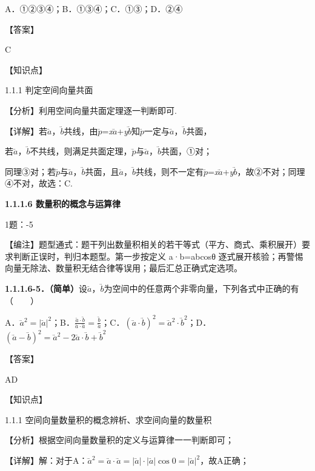 A．①②③④；B．①③④；C．①③；D．②④

【⁠答⁠案⁠】

C　

【⁠知⁠识⁠点⁠】

1.1.1 判定空间向量共面

【⁠分⁠析⁠】利用空间向量共面定理逐一判断即可.

【⁠详⁠解⁠】若\(\overset{⃑}{a}\)，\(\overset{⃑}{b}\)共线，由\(\overset{⃑}{p}\)=\emph{x}\(\overset{⃑}{a}\)+\emph{y}\(\overset{⃑}{b}\)知\(\overset{⃑}{p}\)一定与\(\overset{⃑}{a}\)，\(\overset{⃑}{b}\)共面，

若\(\overset{⃑}{a}\)，\(\overset{⃑}{b}\)不共线，则满足共面定理，\(\overset{⃑}{p}\)与\(\overset{⃑}{a}\)，\(\overset{⃑}{b}\)共面，①对；

同理③对；若\(\overset{⃑}{p}\)与\(\overset{⃑}{a}\)，\(\overset{⃑}{b}\)共面，且\(\overset{⃑}{a}\)，\(\overset{⃑}{b}\)共线，则不一定有\(\overset{⃑}{p}\)=\emph{x}\(\overset{⃑}{a}\)+\emph{y}\(\overset{⃑}{b}\)，故②不对；同理④不对，故选：C.

\textbf{1.1.1.6 数量积的概念与运算律}

1题：-5

【⁠编⁠注⁠】题型通式：题干列出数量积相关的若干等式（平方、商式、乘积展开）要求判断正误时，判归本题型。第一步按定义
a·b=\textbar a\textbar\textbar b\textbar cosθ
逐式展开核验；再警惕向量无除法、数量积无结合律等误用；最后汇总正确式定选项。

\textbf{1.1.1.6-5．（简单）}设\(\overset{⃑}{a}\)，\(\overset{⃑}{b}\)为空间中的任意两个非零向量，下列各式中正确的有（~~~~）

A．\({\overset{⃑}{a}}^{2} = \left| \overset{⃑}{a} \right|^{2}\)；B．\(\frac{\overset{⃑}{a} \cdot \overset{⃑}{b}}{\overset{⃑}{a} \cdot \overset{⃑}{a}} = \frac{\overset{⃑}{b}}{\overset{⃑}{a}}\)；C．\(\left( \overset{⃑}{a} \cdot \overset{⃑}{b} \right)^{2} = {\overset{⃑}{a}}^{2} \cdot {\overset{⃑}{b}}^{2}\)；D．\(\left( \overset{⃑}{a} - \overset{⃑}{b} \right)^{2} = {\overset{⃑}{a}}^{2} - 2\overset{⃑}{a} \cdot \overset{⃑}{b} + {\overset{⃑}{b}}^{2}\)

【⁠答⁠案⁠】

AD　

【⁠知⁠识⁠点⁠】

1.1.1 空间向量数量积的概念辨析、求空间向量的数量积

【⁠分⁠析⁠】根据空间向量数量积的定义与运算律一一判断即可；

【⁠详⁠解⁠】解：对于A：\({\overset{⃑}{a}}^{2} = \overset{⃑}{a} \cdot \overset{⃑}{a} = \left| \overset{⃑}{a} \right| \cdot \left| \overset{⃑}{a} \right|\cos 0 = \left| \overset{⃑}{a} \right|^{2}\)，故A正确；

